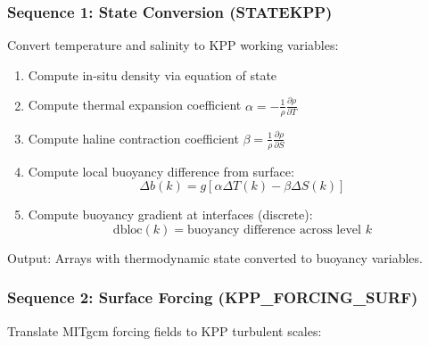 \documentclass[11pt, a4paper]{article}
\begin{document}
\subsubsection{Sequence 1: State Conversion (STATEKPP)}

Convert temperature and salinity to KPP working variables:

\begin{enumerate}
    \item Compute in-situ density via equation of state
    \item Compute thermal expansion coefficient $\alpha = -\frac{1}{\rho}\frac{\partial \rho}{\partial T}$
    \item Compute haline contraction coefficient $\beta = \frac{1}{\rho}\frac{\partial \rho}{\partial S}$
    \item Compute local buoyancy difference from surface:
    \begin{equation}
    \Delta b(k) = g[\alpha \Delta T(k) - \beta \Delta S(k)]
    \end{equation}
    \item Compute buoyancy gradient at interfaces (discrete):
    \begin{equation}
    \text{dbloc}(k) = \text{buoyancy difference across level } k
    \end{equation}
\end{enumerate}

Output: Arrays with thermodynamic state converted to buoyancy variables.

\subsubsection{Sequence 2: Surface Forcing (KPP\_FORCING\_SURF)}

Translate MITgcm forcing fields to KPP turbulent scales:
\end{document}
